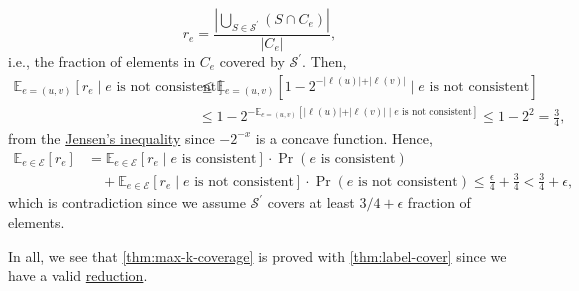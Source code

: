 \begin{enumerate}[(a)]
\begin{explanation}
		      \[
			      r_e = \frac{\left\vert \bigcup_{S\in \mathcal{S} ^\prime } (S \cap C_e) \right\vert}{\vert C_e \vert},
		      \]
		      i.e., the fraction of elements in \(C_e\) covered by \(\mathcal{S} ^\prime \). Then,
		      \[
			      \begin{split}
				      \mathbb{E}_{e=(u, v)}\left[r_e \mid e \text{ is not consistent} \right]
				      &\leq \mathbb{E}_{e=(u, v)}\left[1 - 2^{-\vert \ell (u) \vert + \vert \ell (v) \vert } \mid e \text{ is not consistent} \right]\\
				      &\leq 1 - 2^{-\mathbb{E}_{e=(u, v)}\left[\vert \ell (u) \vert + \vert \ell (v) \vert \mid e \text{ is not consistent} \right]}
				      \leq 1 - 2^{2} = \frac{3}{4},
			      \end{split}
		      \]
		      from the \href{https://en.wikipedia.org/wiki/Jensen's_inequality}{Jensen's inequality} since \(-2^{-x}\) is a concave function. Hence,
		      \[
			      \begin{split}
				      \mathbb{E}_{e\in \mathcal{E} }\left[r_e \right]
				      &= \mathbb{E}_{e\in \mathcal{E} }\left[ r_e \mid e\text{ is consistent} \right] \cdot \Pr_{}(e\text{ is consistent}) \\
				      &\quad + \mathbb{E}_{e\in \mathcal{E} }\left[ r_e \mid e\text{ is not consistent} \right] \cdot \Pr_{}(e\text{ is not consistent})
				      \leq \frac{\epsilon}{4} + \frac{3}{4} < \frac{3}{4} + \epsilon,
			      \end{split}
		      \]
		      which is contradiction since we assume \(\mathcal{S} ^\prime \) covers at least \(3 / 4 + \epsilon \) fraction of elements.
	      \end{explanation}
\end{enumerate}

In all, we see that \autoref{thm:max-k-coverage} is proved with \autoref{thm:label-cover} since we have a valid \hyperref[def:reduction]{reduction}.